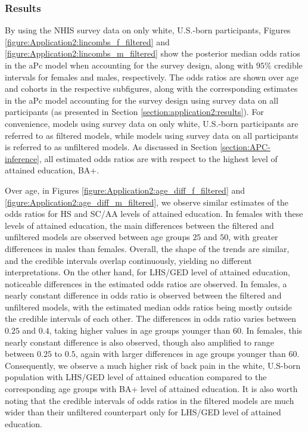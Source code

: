 \subsubsection{Results}
\label{section:application2:extension:results}
\vspace{-0.2cm}
By using the NHIS survey data on only white, U.S.-born participants, Figures \ref{figure:Application2:lincombs_f_filtered} and \ref{figure:Application2:lincombs_m_filtered} show the posterior median odds ratios in the aPc model when accounting for the survey design, along with $95\%$ credible intervals for females and males, respectively. The odds ratios are shown over age and cohorts in the respective subfigures, along with the corresponding estimates in the aPc model accounting for the survey design using survey data on all participants (as presented in Section \ref{section:application2:results}). For convenience, models using survey data on only white, U.S.-born participants are referred to as filtered models, while models using survey data on all participants is referred to as unfiltered models. As discussed in Section \ref{section:APC-inference}, all estimated odds ratios are with respect to the highest level of attained education, BA+. 

\vspace{-0.2cm}
Over age, in Figures \ref{figure:Application2:age_diff_f_filtered} and \ref{figure:Application2:age_diff_m_filtered}, we observe similar estimates of the odds ratios for HS and SC/AA levels of attained education. In females with these levels of attained education, the main differences between the filtered and unfiltered models are observed between age groups $25$ and $50$, with greater differences in males than females. Overall, the shape of the trends are similar, and the credible intervals overlap continuously, yielding no different interpretations. On the other hand, for LHS/GED level of attained education, noticeable differences in the estimated odds ratios are observed. In females, a nearly constant difference in odds ratio is observed between the filtered and unfiltered models, with the estimated median odds ratios being mostly outside the credible intervals of each other. The differences in odds ratio varies between $0.25$ and $0.4$, taking higher values in age groups younger than $60$. In females, this nearly constant difference is also observed, though also amplified to range between $0.25$ to $0.5$, again with larger differences in age groups younger than $60$. Consequently, we observe a much higher risk of back pain in the white, U.S-born population with LHS/GED level of attained education compared to the corresponding age groups with BA+ level of attained education. It is also worth noting that the credible intervals of odds ratios in the filtered models are much wider than their unfiltered counterpart only for LHS/GED level of attained education. 

